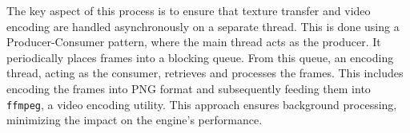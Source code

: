 The key aspect of this process is to ensure that texture transfer and video encoding are handled asynchronously on a separate thread. This is done using a Producer-Consumer pattern, where the main thread acts as the producer. It periodically places frames into a blocking queue. From this queue, an encoding thread, acting as the consumer, retrieves and processes the frames. This includes encoding the frames into PNG format and subsequently feeding them into \verb|ffmpeg|, a video encoding utility. This approach ensures background processing, minimizing the impact on the engine's performance.
